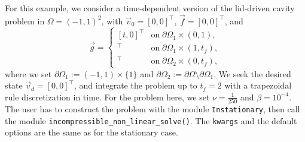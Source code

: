 \documentclass[letterpaper,10pt,english]{sphinxmanual}
\begin{document}
For this example, we consider a time-dependent version of the lid-driven cavity problem in $\Omega = (-1, 1)^2$, with $\vec{v}_0 = [0, 0]^\top$, $\vec{f}=[0, 0]^\top$, and
\begin{displaymath}
\vec{g}=
\left\{
\begin{array}{ll}
[t, 0]^\top & \mathrm{on} \; \partial \Omega_1 \times (0, 1),\\

[1, 0]^\top & \mathrm{on} \; \partial \Omega_1 \times (1, t_f),\\

[0, 0]^\top & \mathrm{on} \; \partial \Omega_2 \times (0, t_f),
\end{array}
\right.
\end{displaymath}
where we set $\partial \Omega_1:=(-1,1) \times \{ 1 \}$ and $\partial \Omega_2 := \partial \Omega \setminus \partial \Omega_1$. We seek the desired state $\vec{v}_d = [0, 0]^\top$, and integrate the problem up to $t_f=2$ with a trapezoidal rule discretization in time. For the problem here, we set $\nu=\frac{1}{250}$ and $\beta=10^{-4}$.\\
The user has to construct the problem with the module \texttt{Instationary}, then call the module \texttt{incompressible{\_}non{\_}linear{\_}solve()}. The \texttt{kwargs} and the default options are the same as for the stationary case.
\end{document}
